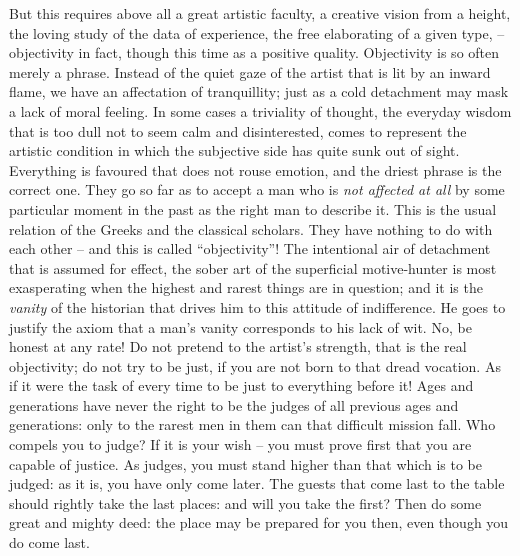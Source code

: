 But this requires above all a great artistic faculty, a creative
vision from a height, the loving study of the data of experience, the
free elaborating of a given type, -- objectivity in fact, though this
time as a positive quality. Objectivity is so often merely a phrase.
Instead of the quiet gaze of the artist that is lit by an inward
flame, we have an affectation of tranquillity; just as a cold
detachment may mask a lack of moral feeling. In some cases a
triviality of thought, the everyday wisdom that is too dull not to
seem calm and disinterested, comes to represent the artistic
condition in which the subjective side has quite sunk out of sight.
Everything is favoured that does not rouse emotion, and the driest
phrase is the correct one. They go so far as to accept a man who is
\textit{not affected at all} by some particular moment in the past as the
right man to describe it. This is the usual relation of the Greeks
and the classical scholars. They have nothing to do with each
other -- and this is called \enquote{objectivity}! The intentional air of
detachment that is assumed for effect, the sober art of the
superficial motive-hunter is most exasperating when the highest and
rarest things are in question; and it is the \textit{vanity} of the
historian that drives him to this attitude of indifference. He goes
to justify the axiom that a man's vanity corresponds to his lack of
wit. No, be honest at any rate! Do not pretend to the artist's
strength, that is the real objectivity; do not try to be just, if you
are not born to that dread vocation. As if it were the task of every
time to be just to everything before it! Ages and generations have
never the right to be the judges of all previous ages and
generations: only to the rarest men in them can that difficult
mission fall. Who compels you to judge? If it is your wish -- you must
prove first that you are capable of justice. As judges, you must
stand higher than that which is to be judged: as it is, you have only
come later. The guests that come last to the table should rightly
take the last places: and will you take the first? Then do some great
and mighty deed: the place may be prepared for you then, even though
you do come last.

